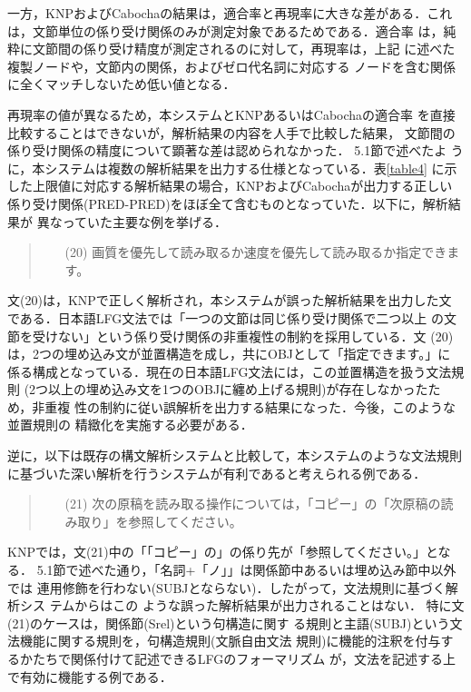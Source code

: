 一方，KNPおよびCabochaの結果は，適合率と再現率に大きな差がある．これ
は，文節単位の係り受け関係のみが測定対象であるためである．適合率
は，純粋に文節間の係り受け精度が測定されるのに対して，再現率は，上記
に述べた複製ノードや，文節内の関係，およびゼロ代名詞に対応する
ノードを含む関係に全くマッチしないため低い値となる．

再現率の値が異なるため，本システムとKNPあるいはCabochaの適合率
を直接比較することはできないが，解析結果の内容を人手で比較した結果，
文節間の係り受け関係の精度について顕著な差は認められなかった．
5.1節で述べたよ
うに，本システムは複数の解析結果を出力する仕様となっている．表\ref{table4}
に示した上限値に対応する解析結果の場合，KNPおよびCabochaが出力する正しい
係り受け関係(PRED-PRED)をほぼ全て含むものとなっていた．以下に，解析結果が
異なっていた主要な例を挙げる．

\begin{quote}
\begin{itemize}
\item[(20)] 画質を優先して読み取るか速度を優先して読み取るか指定できます。
\end{itemize}
\end{quote}
文(20)は，KNPで正しく解析され，本システムが誤った解析結果を出力した文
である．日本語LFG文法では「一つの文節は同じ係り受け関係で二つ以上
の文節を受けない」という係り受け関係の非重複性の制約を採用している．文
(20)は，2つの埋め込み文が並置構造を成し，共にOBJとして「指定できます。」に
係る構成となっている．現在の日本語LFG文法には，この並置構造を扱う文法規則
(2つ以上の埋め込み文を1つのOBJに纏め上げる規則)が存在しなかったため，非重複
性の制約に従い誤解析を出力する結果になった．今後，このような並置規則の
精緻化を実施する必要がある．

逆に，以下は既存の構文解析システムと比較して，本システムのような文法規則
に基づいた深い解析を行うシステムが有利であると考えられる例である．
\begin{quote}
\begin{itemize}
\item[(21)] 次の原稿を読み取る操作については，「コピー」の「次原稿の読み取り」を参照してください。
\end{itemize}
\end{quote}
KNPでは，文(21)中の「「コピー」の」の係り先が「参照してください。」となる．
5.1節で述べた通り，「名詞+「ノ」」は関係節中あるいは埋め込み節中以外では
連用修飾を行わない(SUBJとならない)．したがって，文法規則に基づく解析シス
テムからはこの
ような誤った解析結果が出力されることはない．
特に文(21)のケースは，関係節(Srel)という句構造に関す
る規則と主語(SUBJ)という文法機能に関する規則を，句構造規則(文脈自由文法
規則)に機能的注釈を付与するかたちで関係付けて記述できるLFGのフォーマリズム
が，文法を記述する上で有効に機能する例である．

